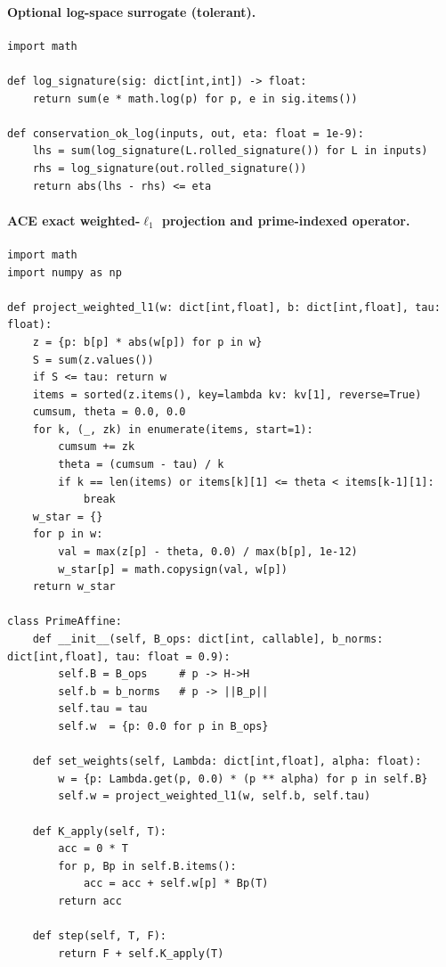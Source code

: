 \documentclass[11pt]{article}
\theoremstyle{plain}
\theoremstyle{definition}
\theoremstyle{remark}
\begin{document}
\paragraph{Optional log-space surrogate (tolerant).}
\begin{verbatim}
import math

def log_signature(sig: dict[int,int]) -> float:
    return sum(e * math.log(p) for p, e in sig.items())

def conservation_ok_log(inputs, out, eta: float = 1e-9):
    lhs = sum(log_signature(L.rolled_signature()) for L in inputs)
    rhs = log_signature(out.rolled_signature())
    return abs(lhs - rhs) <= eta
\end{verbatim}

\paragraph{ACE exact weighted-\(\ell_1\) projection and prime-indexed operator.}
\begin{verbatim}
import math
import numpy as np

def project_weighted_l1(w: dict[int,float], b: dict[int,float], tau: float):
    z = {p: b[p] * abs(w[p]) for p in w}
    S = sum(z.values())
    if S <= tau: return w
    items = sorted(z.items(), key=lambda kv: kv[1], reverse=True)
    cumsum, theta = 0.0, 0.0
    for k, (_, zk) in enumerate(items, start=1):
        cumsum += zk
        theta = (cumsum - tau) / k
        if k == len(items) or items[k][1] <= theta < items[k-1][1]:
            break
    w_star = {}
    for p in w:
        val = max(z[p] - theta, 0.0) / max(b[p], 1e-12)
        w_star[p] = math.copysign(val, w[p])
    return w_star

class PrimeAffine:
    def __init__(self, B_ops: dict[int, callable], b_norms: dict[int,float], tau: float = 0.9):
        self.B = B_ops     # p -> H->H
        self.b = b_norms   # p -> ||B_p||
        self.tau = tau
        self.w  = {p: 0.0 for p in B_ops}

    def set_weights(self, Lambda: dict[int,float], alpha: float):
        w = {p: Lambda.get(p, 0.0) * (p ** alpha) for p in self.B}
        self.w = project_weighted_l1(w, self.b, self.tau)

    def K_apply(self, T):
        acc = 0 * T
        for p, Bp in self.B.items():
            acc = acc + self.w[p] * Bp(T)
        return acc

    def step(self, T, F):
        return F + self.K_apply(T)
\end{verbatim}
\end{document}
